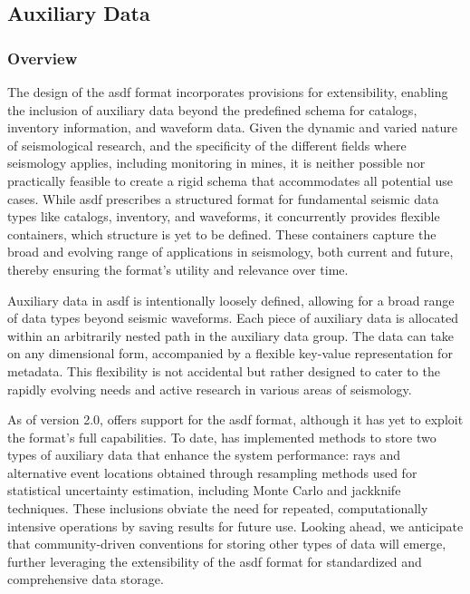  
\subsection{Auxiliary Data}

\subsubsection{Overview}

The design of the \gls{asdf} format incorporates provisions for extensibility, enabling the inclusion of auxiliary data beyond the predefined schema for catalogs, inventory information, and waveform data. Given the dynamic and varied nature of seismological research, and the specificity of the different fields where seismology applies, including \museismic monitoring in mines, it is neither possible nor practically feasible to create a rigid schema that accommodates all potential use cases. While \gls{asdf} prescribes a structured format for fundamental seismic data types like catalogs, inventory, and waveforms, it concurrently provides flexible containers, which structure is yet to be defined. These containers capture the broad and evolving range of applications in seismology, both current and future, thereby ensuring the format's utility and relevance over time.

Auxiliary data in \gls{asdf} is intentionally loosely defined, allowing for a broad range of data types beyond seismic waveforms. Each piece of auxiliary data is allocated within an arbitrarily nested path in the auxiliary data group. The data can take on any dimensional form, accompanied by a flexible key-value representation for metadata. This flexibility is not accidental but rather designed to cater to the rapidly evolving needs and active research in various areas of seismology.

As of version 2.0, \muquake offers support for the \gls{asdf} format, although it has yet to exploit the format's full capabilities. To date, \muquake has implemented methods to store two types of auxiliary data that enhance the system performance: rays and alternative event locations obtained through resampling methods used for statistical uncertainty estimation, including Monte Carlo and jackknife techniques. These inclusions obviate the need for repeated, computationally intensive operations by saving results for future use. Looking ahead, we anticipate that community-driven conventions for storing other types of data will emerge, further leveraging the extensibility of the \gls{asdf} format for standardized and comprehensive data storage.


